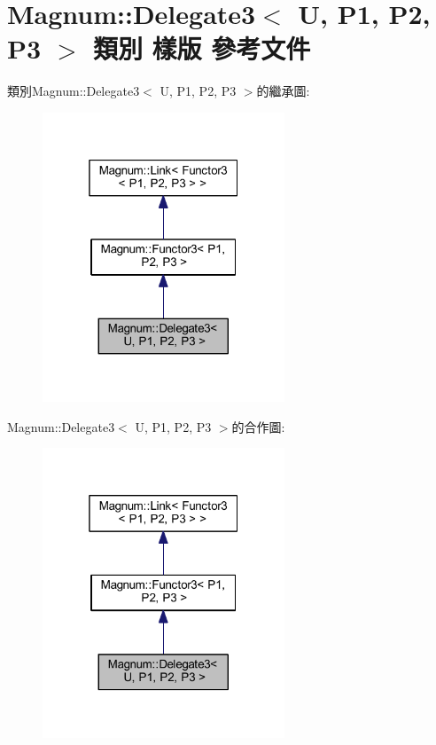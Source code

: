 \hypertarget{class_magnum_1_1_delegate3}{}\section{Magnum\+:\+:Delegate3$<$ U, P1, P2, P3 $>$ 類別 樣版 參考文件}
\label{class_magnum_1_1_delegate3}


類別\+Magnum\+:\+:Delegate3$<$ U, P1, P2, P3 $>$的繼承圖\+:\nopagebreak
\begin{figure}[H]
\begin{center}
\leavevmode
\includegraphics[width=205pt]{class_magnum_1_1_delegate3__inherit__graph}
\end{center}
\end{figure}


Magnum\+:\+:Delegate3$<$ U, P1, P2, P3 $>$的合作圖\+:\nopagebreak
\begin{figure}[H]
\begin{center}
\leavevmode
\includegraphics[width=205pt]{class_magnum_1_1_delegate3__coll__graph}
\end{center}
\end{figure}
